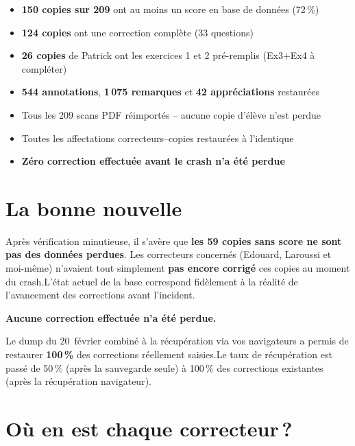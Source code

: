 \documentclass[11pt,a4paper]{article}
\begin{document}
\begin{okbox}
	\begin{itemize}
		\item \textbf{150 copies sur 209} ont au moins un score en base de donn\'{e}es (72\,\%)
		\item \textbf{124 copies} ont une correction compl\`{e}te (33 questions)
		\item \textbf{26 copies} de Patrick ont les exercices 1 et 2 pr\'{e}-remplis (Ex3+Ex4 \`{a} compl\'{e}ter)
		\item \textbf{544 annotations}, \textbf{1\,075 remarques} et \textbf{42 appr\'{e}ciations} restaur\'{e}es
		\item Tous les 209 scans PDF r\'{e}import\'{e}s -- aucune copie d'\'{e}l\`{e}ve n'est perdue
		\item Toutes les affectations correcteurs--copies restaur\'{e}es \`{a} l'identique
		\item \textbf{Z\'{e}ro correction effectu\'{e}e avant le crash n'a \'{e}t\'{e} perdue}
	\end{itemize}
\end{okbox}

\section{La bonne nouvelle}

Apr\`{e}s v\'{e}rification minutieuse, il s'av\`{e}re que \textbf{les 59 copies sans score ne sont pas des donn\'{e}es perdues}. Les correcteurs concern\'{e}s (Edouard, Laroussi et moi-m\^{e}me) n'avaient tout simplement \textbf{pas encore corrig\'{e}} ces copies au moment du crash.\@ L'\'{e}tat actuel de la base correspond fid\`{e}lement \`{a} la r\'{e}alit\'{e} de l'avancement des corrections avant l'incident.

\begin{okbox}
	\centerline{\large\bfseries Aucune correction effectu\'{e}e n'a \'{e}t\'{e} perdue.}

	\medskip
	Le dump du 20~f\'{e}vrier combin\'{e} \`{a} la r\'{e}cup\'{e}ration via vos navigateurs a permis de restaurer \textbf{100\,\%} des corrections r\'{e}ellement saisies.\@ Le taux de r\'{e}cup\'{e}ration est pass\'{e} de 50\,\% (apr\`{e}s la sauvegarde seule) \`{a} 100\,\% des corrections existantes (apr\`{e}s la r\'{e}cup\'{e}ration navigateur).
\end{okbox}

\section{O\`{u} en est chaque correcteur\,?}
\end{document}
